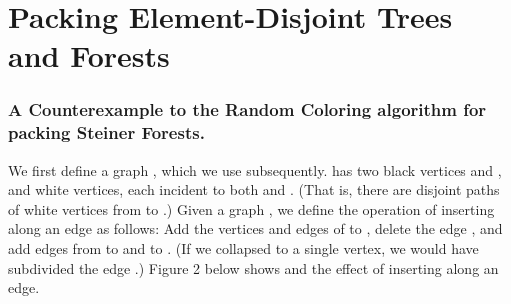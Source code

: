 \documentclass[11pt]{article}
\newenvironment{proofof}[1]{\smallskip\noindent{\bf Proof of #1:}}{\hspace*{\fill}\par}
\begin{document}
\appendix


\section{Packing Element-Disjoint Trees and Forests}
\label{app:packing}

\iffalse
\subsection{Packing Trees and Forests in General Graphs}
\label{app:packGeneral}
\begin{proofof}{Lemma~\ref{lem:separator}}
  Let  be an instance of the Steiner Forest packing problem,
  with terminal sets  such that each  is
  -element-connected.  If  is -element
  connected, the empty set  is a good separator.

  Otherwise, there is some set of white vertices of size less than
   that separates some of the terminals from
  others. Let  be a minimal such set, and consider the two or
  more components of . Note that each  is entirely
  contained in a single component, since  is at least
  -element-connected, and . Among the components of
   that contain terminals, consider a component  with the
  fewest sets of terminals;  must have at most  sets from
  . If the set of all terminals in  is
   connected, we stop, otherwise, find in  a
  set of white vertices  with size less than 
  that separates terminals of .  Again, find a component  of
   with fewest sets of terminals, and repeat this procedure
  until we obtain some subgraph  in which all the terminals
  are -connected.  We can always find such a
  subgraph, since the number of sets of terminals is decreasing by a
  factor of  or more at each stage, so we find at most 
  separating sets .  Now, we observe that the set  is a good separator. It separates the terminals
  in  from the rest of , and its size is at most ; it follows that each set of
  terminals  is entirely within , or entirely outside
  it. By construction, all terminals in  are  connected.
\end{proofof}
\fi

\subsubsection*{A Counterexample to the Random Coloring algorithm for
packing Steiner Forests.}\label{subsec:counterexample}

We first define a graph , which we use subsequently.  has
two black vertices  and , and  white vertices, each incident
to both  and . (That is, there are  disjoint paths of white
vertices from  to .) Given a graph , we define the operation
of inserting  along an edge  as follows: Add the
vertices and edges of  to , delete the edge , and add
edges from  to  and  to . (If we collapsed  to a
single vertex, we would have subdivided the edge .) Figure 2 below
shows  and the effect of inserting  along an edge.
\end{document}
